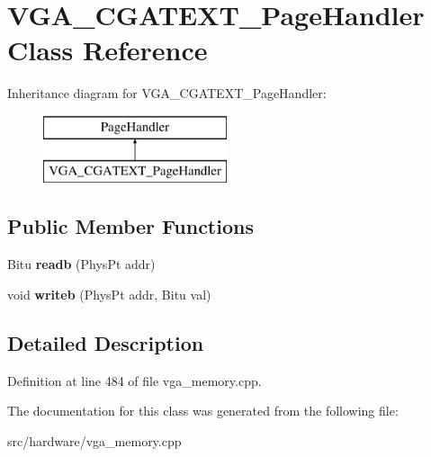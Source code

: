 \hypertarget{classVGA__CGATEXT__PageHandler}{\section{V\-G\-A\-\_\-\-C\-G\-A\-T\-E\-X\-T\-\_\-\-Page\-Handler Class Reference}
\label{classVGA__CGATEXT__PageHandler}
}
Inheritance diagram for V\-G\-A\-\_\-\-C\-G\-A\-T\-E\-X\-T\-\_\-\-Page\-Handler\-:\begin{figure}[H]
\begin{center}
\leavevmode
\includegraphics[height=2.000000cm]{classVGA__CGATEXT__PageHandler}
\end{center}
\end{figure}
\subsection*{Public Member Functions}
\begin{DoxyCompactItemize}
\item 
\hypertarget{classVGA__CGATEXT__PageHandler_a37c43a069f9246f5fbc64d9328ab1d9f}{Bitu {\bfseries readb} (Phys\-Pt addr)}\label{classVGA__CGATEXT__PageHandler_a37c43a069f9246f5fbc64d9328ab1d9f}

\item 
\hypertarget{classVGA__CGATEXT__PageHandler_a3115b616f5ce1a32ff1b9b39aa6ec41a}{void {\bfseries writeb} (Phys\-Pt addr, Bitu val)}\label{classVGA__CGATEXT__PageHandler_a3115b616f5ce1a32ff1b9b39aa6ec41a}

\end{DoxyCompactItemize}


\subsection{Detailed Description}


Definition at line 484 of file vga\-\_\-memory.\-cpp.



The documentation for this class was generated from the following file\-:\begin{DoxyCompactItemize}
\item 
src/hardware/vga\-\_\-memory.\-cpp\end{DoxyCompactItemize}

